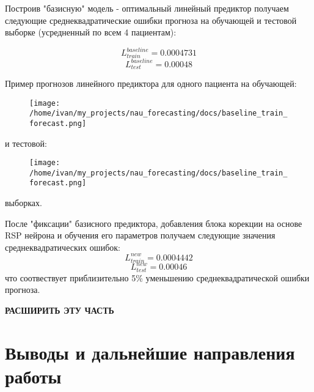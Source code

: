 \documentclass[11pt]{article}
\begin{document}
Построив "базисную" модель - оптимальный линейный предиктор получаем следующие среднеквадратические ошибки прогноза на обучающей и тестовой выборке (усредненный по всем 4 пациентам):

$$ L^{baseline}_{train} = 0.0004731 $$
$$ L^{baseline}_{test} = 0.00048 $$

Пример прогнозов линейного предиктора для одного пациента на обучающей:
\begin{figure}[H]
\centering
\texttt{[image: /home/ivan/my\_projects/nau\_forecasting/docs/baseline\_train\_forecast.png]}
\label{}
\end{figure}
 и тестовой:
\begin{figure}[H]
\centering
\texttt{[image: /home/ivan/my\_projects/nau\_forecasting/docs/baseline\_train\_forecast.png]}
\label{}
\end{figure}
выборках.

После "фиксации" базисного предиктора, добавления блока корекции на основе RSP нейрона и обучения его параметров получаем следующие значения среднеквадратических ошибок:
$$ L^{new}_{train} = 0.0004442 $$
$$ L^{new}_{test} = 0.00046 $$ 
что соотвествует приблизительно 5\% уменьшению среднеквадратической ошибки прогноза. 


\textbf{РАСШИРИТЬ ЭТУ ЧАСТЬ}

\section*{Выводы и дальнейшие направления работы}
\end{document}
